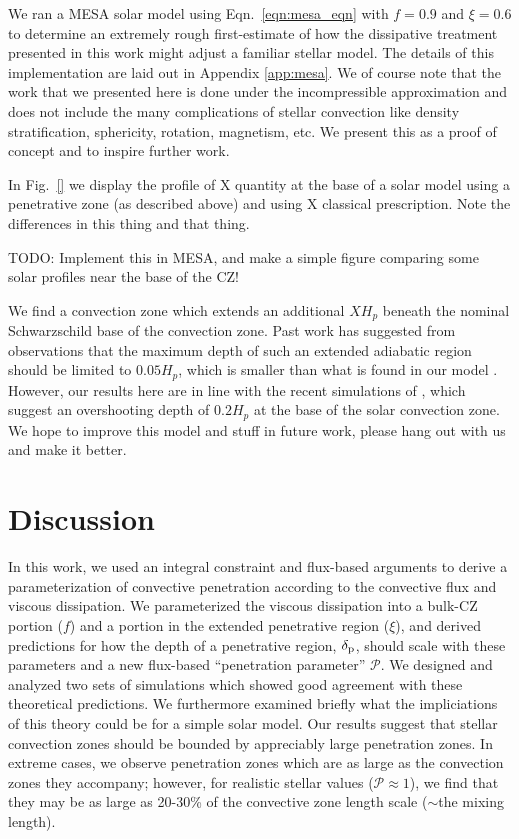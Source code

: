 \documentclass{aastex631}
\newcommand{\delp}{\ensuremath{\delta_{\rm{p}}}}
\newcommand{\mP}{\ensuremath{\mathcal{P}}}
\begin{document}
We ran a MESA solar model using Eqn.~\ref{eqn:mesa_eqn} with $f = 0.9$ and $\xi = 0.6$ to determine an extremely rough first-estimate of how the dissipative treatment presented in this work might adjust a familiar stellar model.
The details of this implementation are laid out in Appendix \ref{app:mesa}.
We of course note that the work that we presented here is done under the incompressible approximation and does not include the many complications of stellar convection like density stratification, sphericity, rotation, magnetism, etc.
We present this as a proof of concept and to inspire further work.

In Fig.~\ref{} we display the profile of X quantity at the base of a solar model using a penetrative zone (as described above) and using X classical prescription.
Note the differences in this thing and that thing.

TODO: Implement this in MESA, and make a simple figure comparing some solar profiles near the base of the CZ!

We find a convection zone which extends an additional $X H_p$ beneath the nominal Schwarzschild base of the convection zone.
Past work has suggested from observations that the maximum depth of such an extended adiabatic region should be limited to $0.05 H_p$, which is smaller than what is found in our model \citep[see e.g., section 7.2.1 of][]{basu2016}.
However, our results here are in line with the recent simulations of \citet{kapyla2019}, which suggest an overshooting depth of $0.2 H_p$ at the base of the solar convection zone.
We hope to improve this model and stuff in future work, please hang out with us and make it better.


\section{Discussion}
\label{sec:discussion}
In this work, we used an integral constraint \citep[reminiscent of][]{roxburgh1989} and flux-based arguments \citep[similar to][]{zahn1991} to derive a parameterization of convective penetration according to the convective flux and viscous dissipation.
We parameterized the viscous dissipation into a bulk-CZ portion ($f$) and a portion in the extended penetrative region ($\xi$), and derived predictions for how the depth of a penetrative region, $\delp$, should scale with these parameters and a new flux-based ``penetration parameter'' $\mP$.
We designed and analyzed two sets of simulations which showed good agreement with these theoretical predictions.
We furthermore examined briefly what the impliciations of this theory could be for a simple solar model.
Our results suggest that stellar convection zones should be bounded by appreciably large penetration zones.
In extreme cases, we observe penetration zones which are as large as the convection zones they accompany; however, for realistic stellar values ($\mP \approx 1$), we find that they may be as large as 20-30\% of the convective zone length scale ($\sim$the mixing length).
\end{document}
